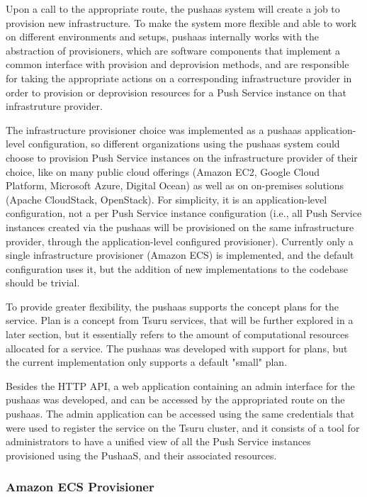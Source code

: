 Upon a call to the appropriate route, the pushaas system will create a job to provision new infrastructure. To make the system more flexible and able to work on different environments and setups, pushaas internally works with the abstraction of provisioners, which are software components that implement a common interface with provision and deprovision methods, and are responsible for taking the appropriate actions on a corresponding infrastructure provider in order to provision or deprovision resources for a Push Service instance on that infrastruture provider.

The infrastructure provisioner choice was implemented as a pushaas application-level configuration, so different organizations using the pushaas system could choose to provision Push Service instances on the infrastructure provider of their choice, like on many public cloud offerings (Amazon EC2, Google Cloud Platform, Microsoft Azure, Digital Ocean) as well as on on-premises solutions (Apache CloudStack, OpenStack). For simplicity, it is an application-level configuration, not a per Push Service instance configuration (i.e., all Push Service instances created via the pushaas will be provisioned on the same infrastructure provider, through the application-level configured provisioner). Currently only a single infrastructure provisioner (Amazon ECS) is implemented, and the default configuration uses it, but the addition of new implementations to the codebase should be trivial.

To provide greater flexibility, the pushaas supports the concept plans for the service. Plan is a concept from Tsuru services, that will be further explored in a later section, but it essentially refers to the amount of computational resources allocated for a service. The pushaas was developed with support for plans, but the current implementation only supports a default "small" plan.

Besides the HTTP API, a web application containing an admin interface for the pushaas was developed, and can be accessed by the appropriated route on the pushaas. The admin application can be accessed using the same credentials that were used to register the service on the Tsuru cluster, and it consists of a tool for administrators to have a unified view of all the Push Service instances provisioned using the PushaaS, and their associated resources.


\subsubsection{Amazon ECS Provisioner}

